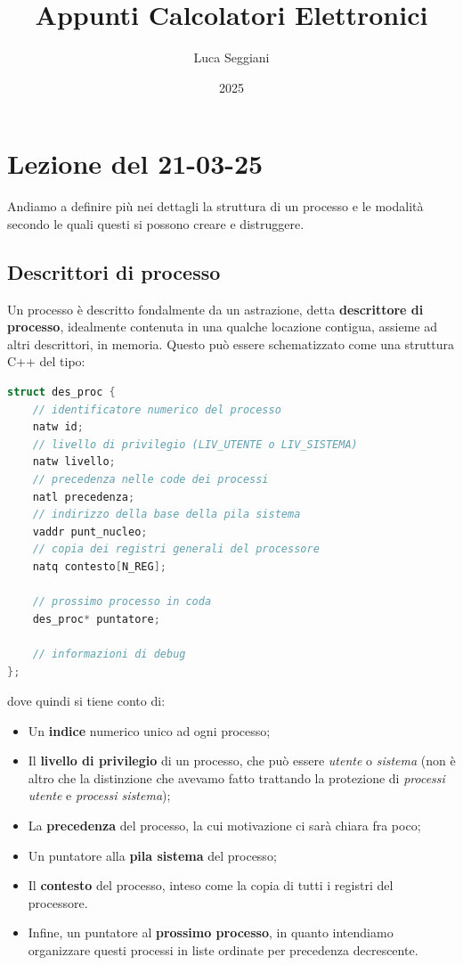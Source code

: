 \documentclass[a4paper,11pt]{article}
\title{Appunti Calcolatori Elettronici}
\author{Luca Seggiani}
\date{2025}
\begin{document}
\section{Lezione del 21-03-25}

\thispagestyle{empty}
\pagestyle{fancy}

Andiamo a definire più nei dettagli la struttura di un processo e le modalità secondo le quali questi si possono creare e distruggere.

\subsection{Descrittori di processo}
Un processo è descritto fondalmente da un astrazione, detta \textbf{descrittore di processo}, idealmente contenuta in una qualche locazione contigua, assieme ad altri descrittori, in memoria.
Questo può essere schematizzato come una struttura C++ del tipo:
\begin{lstlisting}[language=C++, style=codestyle]	
struct des_proc {
	// identificatore numerico del processo
	natw id;
	// livello di privilegio (LIV_UTENTE o LIV_SISTEMA)
	natw livello;
	// precedenza nelle code dei processi
	natl precedenza;
	// indirizzo della base della pila sistema
	vaddr punt_nucleo;
	// copia dei registri generali del processore
	natq contesto[N_REG];

	// prossimo processo in coda
	des_proc* puntatore;

	// informazioni di debug
};
\end{lstlisting}
dove quindi si tiene conto di:
\begin{itemize}
	\item Un \textbf{indice} numerico unico ad ogni processo;
	\item Il \textbf{livello di privilegio} di un processo, che può essere \textit{utente} o \textit{sistema} (non è altro che la distinzione che avevamo fatto trattando la protezione di \textit{processi utente} e \textit{processi sistema});
	\item La \textbf{precedenza} del processo, la cui motivazione ci sarà chiara fra poco;
	\item Un puntatore alla \textbf{pila sistema} del processo;
	\item Il \textbf{contesto} del processo, inteso come la copia di tutti i registri del processore. 
	\item Infine, un puntatore al \textbf{prossimo processo}, in quanto intendiamo organizzare questi processi in liste ordinate per precedenza decrescente.
\end{itemize}
\end{document}
